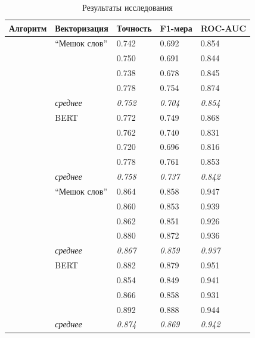 \begin{table}[H]
	\begin{center}
		\captionsetup{justification=centering}
		\caption{\label{table:result2} Результаты исследования}
		\begin{tabular}{|p{3cm}|p{4cm}|p{2.4cm}|p{2.4cm}|p{2.4cm}|}
				\hline
			Алгоритм & Векторизация & Точность & F1-мера & ROC-AUC \\
				\hline\hline
				
			& ``Мешок слов'' & 0.742 & 0.692 & 0.854 \\
				& & 0.750 & 0.691 & 0.844 \\
				& & 0.738 & 0.678 & 0.845 \\
				& & 0.778 & 0.754 & 0.874 \\
				 & \textit{среднее} & \textit{0.752} & \textit{0.704} & \textit{0.854} \\
			& BERT & 0.772 & 0.749 & 0.868 \\
				& & 0.762 & 0.740 & 0.831 \\
				& & 0.720 & 0.696 & 0.816 \\
				& & 0.778 & 0.761 & 0.853 \\
				 & \textit{среднее} & \textit{0.758} & \textit{0.737} & \textit{0.842} \\
			\hline\hline
			
			& ``Мешок слов'' & 0.864 & 0.858 & 0.947 \\
				& & 0.860 & 0.853 & 0.939 \\
				& & 0.862 & 0.851 & 0.926 \\
				& & 0.880 & 0.872 & 0.936 \\
				 & \textit{среднее} & \textit{0.867} & \textit{0.859} & \textit{0.937} \\
			& BERT & 0.882 & 0.879 & 0.951 \\
				& & 0.854 & 0.849 & 0.941 \\
				& & 0.866 & 0.858 & 0.931 \\
				& & 0.892 & 0.888 & 0.944 \\
				 & \textit{среднее} & \textit{0.874} & \textit{0.869} & \textit{0.942} \\
			\hline\hline
			

\end{tabular}
\end{center}
\end{table}
